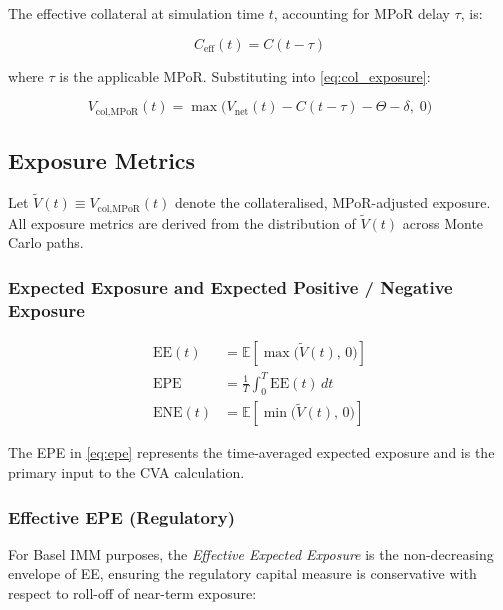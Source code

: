 \documentclass[11pt,a4paper]{article}
\begin{document}
The effective collateral at simulation time $t$, accounting for MPoR delay
$\tau$, is:

\begin{equation}
  C_{\text{eff}}(t) = C(t - \tau)
  \label{eq:coleff}
\end{equation}

where $\tau$ is the applicable MPoR. Substituting into \eqref{eq:col_exposure}:

\begin{equation}
  V_{\text{col,MPoR}}(t)
    = \max\!\bigl(V_{\text{net}}(t) - C(t-\tau) - \Theta - \delta,\; 0\bigr)
  \label{eq:mpor_exposure}
\end{equation}

\subsection{Exposure Metrics}

Let $\tilde{V}(t) \equiv V_{\text{col,MPoR}}(t)$ denote the collateralised,
MPoR-adjusted exposure. All exposure metrics are derived from the distribution
of $\tilde{V}(t)$ across Monte Carlo paths.

\subsubsection{Expected Exposure and Expected Positive / Negative Exposure}

\begin{align}
  \text{EE}(t)  &= \mathbb{E}\!\left[\max\!\bigl(\tilde{V}(t),\, 0\bigr)\right]
  \label{eq:ee} \\[4pt]
  \text{EPE}    &= \frac{1}{T} \int_0^T \text{EE}(t)\, dt
  \label{eq:epe} \\[4pt]
  \text{ENE}(t) &= \mathbb{E}\!\left[\min\!\bigl(\tilde{V}(t),\, 0\bigr)\right]
  \label{eq:ene}
\end{align}

The EPE in \eqref{eq:epe} represents the time-averaged expected exposure and
is the primary input to the CVA calculation.

\subsubsection{Effective EPE (Regulatory)}

For Basel IMM purposes, the \emph{Effective Expected Exposure} is the
non-decreasing envelope of EE, ensuring the regulatory capital measure is
conservative with respect to roll-off of near-term exposure:
\end{document}

